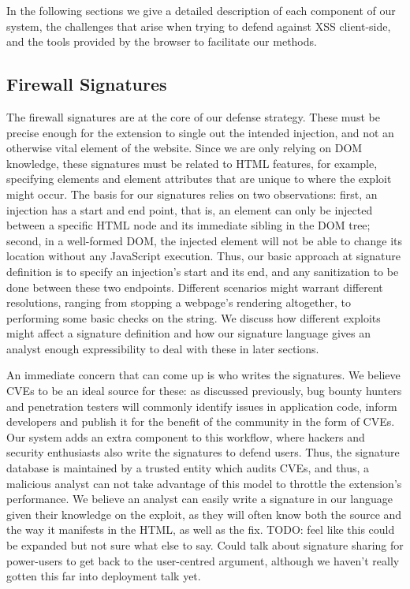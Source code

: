 In the following sections we give a detailed description of each component of our system, the challenges that arise when trying to defend against XSS client-side, and the tools provided by the browser to facilitate our methods. 
 
 \subsection{Firewall Signatures}
	 The firewall signatures are at the core of our defense strategy. These must be precise enough for the extension to single out the intended injection, and not an otherwise vital element of the website. Since we are only relying on DOM knowledge, these signatures must be related to HTML features, for example, specifying elements and element attributes that are unique to where the exploit might occur. The basis for our signatures relies on two observations: first, an injection has a start and end point, that is, an element can only be injected between a specific HTML node and its immediate sibling in the DOM tree; second, in a well-formed DOM, the injected element will not be able to change its location without any JavaScript execution. Thus, our basic approach at signature definition is to specify an injection's start and its end, and any sanitization to be done between these two endpoints. Different scenarios might warrant different resolutions, ranging from stopping a webpage's rendering altogether, to performing some basic checks on the string. We discuss how different exploits might affect a signature definition and how our signature language gives an analyst enough expressibility to deal with these in later sections.
	 
	An immediate concern that can come up is who writes the signatures. We believe CVEs to be an ideal source for these: as discussed previously, bug bounty hunters and penetration testers will commonly identify issues in application code, inform developers and publish it for the benefit of the community in the form of CVEs. Our system adds an extra component to this workflow, where hackers and security enthusiasts also write the signatures to defend users. Thus, the signature database is maintained by a trusted entity which audits CVEs, and thus, a malicious analyst can not take advantage of this model to throttle the extension's performance. We believe an analyst can easily write a signature in our language given their knowledge on the exploit, as they will often know both the source and the way it manifests in the HTML, as well as the fix. TODO: feel like this could be expanded but not sure what else to say. Could talk about signature sharing for power-users to get back to the user-centred argument, although we haven't really gotten this far into deployment talk yet.
 
